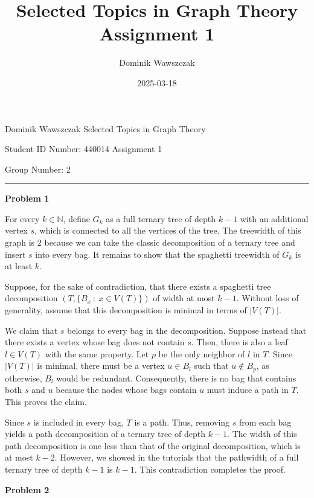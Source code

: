 \documentclass[12pt]{article}
\title{Selected Topics in Graph Theory Assignment 1}
\author{Dominik Wawszczak}
\date{2025-03-18}
\begin{document}
	\setlength{\parindent}{0 cm}
	
	Dominik Wawszczak \hfill Selected Topics in Graph Theory
	
	Student ID Number: 440014 \hfill Assignment 1
	
	Group Number: 2
	
	\bigskip
	\hrule
	\bigskip
	
	\textbf{Problem 1}
	
	\medskip
	
	For every \(k \in \mathbb{N}\), define \(G_{k}\) as a full ternary tree of
	depth \(k - 1\) with an additional vertex \(s\), which is connected to all
	the vertices of the tree. The treewidth of this graph is \(2\) because we
	can take the classic decomposition of a ternary tree and insert \(s\) into
	every bag. It remains to show that the spaghetti treewidth of \(G_{k}\) is
	at least \(k\).
	
	\medskip
	
	Suppose, for the sake of contradiction, that there exists a spaghetti tree
	decomposition \((T, \{B_{x} \ : \ x \in V(T)\})\) of width at most \(k -
	1\). Without loss of generality, assume that this decomposition is minimal
	in terms of \(|V(T)|\).
	
	\medskip
	
	We claim that \(s\) belongs to every bag in the decomposition. Suppose
	instead that there exists a vertex whose bag does not contain \(s\). Then,
	there is also a leaf \(l \in V(T)\) with the same property. Let \(p\) be the
	only neighbor of \(l\) in \(T\). Since \(|V(T)|\) is minimal, there must be
	a vertex \(u \in B_{l}\) such that \(u \notin B_{p}\), as otherwise,
	\(B_{l}\) would be redundant. Consequently, there is no bag that contains
	both \(s\) and \(u\) because the nodes whose bags contain \(u\) must induce
	a path in \(T\). This proves the claim.
	
	\medskip
	
	Since \(s\) is included in every bag, \(T\) is a path. Thus, removing \(s\)
	from each bag yields a path decomposition of a ternary tree of depth \(k -
	1\). The width of this path decomposition is one less than that of the
	original decomposition, which is at most \(k - 2\). However, we showed in
	the tutorials that the pathwidth of a full ternary tree of depth \(k - 1\)
	is \(k - 1\). This contradiction completes the proof.
	
	\bigskip
	
	\textbf{Problem 2}
	
	\medskip
	
\end{document}
